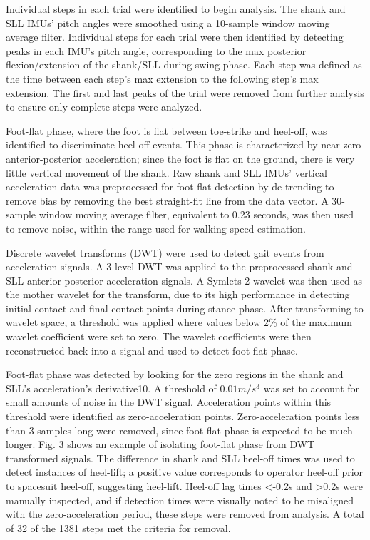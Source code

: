 \documentclass[defaultstyle,11pt]{thesis}
\begin{document}
Individual steps in each trial were identified to begin analysis.
The shank and SLL IMUs' pitch angles were smoothed using a 10-sample window moving average filter.
Individual steps for each trial were then identified by detecting peaks in each IMU's pitch angle, corresponding to the max posterior flexion/extension of the shank/SLL during swing phase.
Each step was defined as the time between each step's max extension to the following step's max extension.
The first and last peaks of the trial were removed from further analysis to ensure only complete steps were analyzed.

Foot-flat phase, where the foot is flat between toe-strike and heel-off, was identified to discriminate heel-off events.
This phase is characterized by near-zero anterior-posterior acceleration; since the foot is flat on the ground, there is very little vertical movement of the shank\citep{Rebula2013}.
Raw shank and SLL IMUs' vertical acceleration data was preprocessed for foot-flat detection by de-trending to remove bias by removing the best straight-fit line from the data vector.
A 30-sample window moving average filter, equivalent to 0.23 seconds, was then used to remove noise, within the range used for walking-speed estimation\citep{Byun2019}.

Discrete wavelet transforms (DWT) were used to detect gait events from acceleration signals\citep{Ji2019}.
A 3-level DWT was applied to the preprocessed shank and SLL anterior-posterior acceleration signals.
A Symlets 2 wavelet was then used as the mother wavelet for the transform, due to its high performance in detecting initial-contact and final-contact points during stance phase\citep{Ji2019}.
After transforming to wavelet space, a threshold was applied where values below 2\% of the maximum wavelet coefficient were set to zero.
The wavelet coefficients were then reconstructed back into a signal and used to detect foot-flat phase.

Foot-flat phase was detected by looking for the zero regions in the shank and SLL's acceleration's derivative10.
A threshold of \(0.01 m/s^3\) was set to account for small amounts of noise in the DWT signal.
Acceleration points within this threshold were identified as zero-acceleration points.
Zero-acceleration points less than 3-samples long were removed, since foot-flat phase is expected to be much longer.
Fig. 3 shows an example of isolating foot-flat phase from DWT transformed signals.
The difference in shank and SLL heel-off times was used to detect instances of heel-lift; a positive value corresponds to operator heel-off prior to spacesuit heel-off, suggesting heel-lift.
Heel-off lag times \textless-0.2s and \textgreater0.2s were manually inspected, and if detection times were visually noted to be misaligned with the zero-acceleration period, these steps were removed from analysis.
A total of 32 of the 1381 steps met the criteria for removal.
\end{document}
